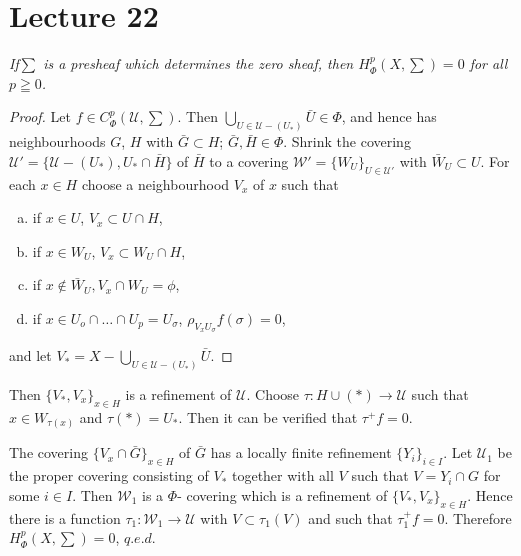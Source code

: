 \chapter{Lecture 22}\label{chap22:lec22}%

\textit{If\pageoriginale $\sum$ is a presheaf which determines the
  zero sheaf, then $H^p_{\Phi}(X, \sum) = 0$ for all $p \geqq 0$.} 

\begin{proof}
Let $f \in C^p_{\Phi} \left(\mathscr{U}, \sum \right)$. Then $\bigcup
\limits_{ U \in \mathscr{U} -(U_\ast)} \bar{U} \in \Phi$, and hence
has neighbourhoods 
$G$, $H$ with $\bar{G} \subset H$; $\bar{G}, \bar{H} \in \Phi$. Shrink
the covering 
$\mathscr{U}'=\bigg\{ \mathscr{U}-(U_*),U_* \cap \bar{H} \bigg\}$ of
$\bar{H}$ to a covering $\mathscr{W}' = \big\{ W_U \big\}_{U
  \in\mathscr{U}'}$ with $\bar{W}_U \subset U$. For each $x \in H$
choose a neighbourhood $V_x$ of $x$ such that  
\begin{enumerate}[a)]
\item if $x \in U$, $V_x \subset U \cap H$,

\item if $x \in W_U$, $V_x \subset W_U \cap H$,

\item if $x \notin \bar{W}_U, V_x \cap W_U = \phi$,

\item if $x \in U_o \cap \ldots \cap U_p = U_{\sigma}$, $\rho_{V_x
  U_{\sigma}} f(\sigma) = 0$, 
\end{enumerate}
and let $V_\ast = X- \bigcup\limits_{U \in \mathscr{U}-(U_*)} \bar{U}$. 
\end{proof}

Then $\bigg\{V_*,V_x \bigg\}_{x \in H}$ is a refinement of
$\mathscr{U}$. Choose $\tau : H \cup (\ast) \to \mathscr{U}$ such that $
x \in W_{\tau(x)}$ and $\tau(*)=U_*$. Then it can be verified that
$\tau^+ f =0$. 

The covering $\bigg\{ V_x \cap \bar{G}\bigg\}_{ x \in H}$ of $\bar{G}$ 
has a locally finite refinement $\{Y_i \}_{i \in I}$. Let
$\mathscr{U}_1$ be the proper covering consisting of $V_*$ together
with all $V$ such that $V =Y_i \cap G$ for some $i \in I$. Then
$\mathscr{W}_1$ is a $\Phi$- covering which is a refinement of
$\bigg\{ V_* ,V_x \bigg\}_{x \in H}$. Hence there is a function $\tau_1
: \mathscr{W}_1 \to \mathscr{U}$ with $V \subset \tau_1 (V)$ and such
that $\tau^+_1 f = 0$. Therefore $H^p_{\Phi}(X,\sum)=0$, $q.e.d$.  

